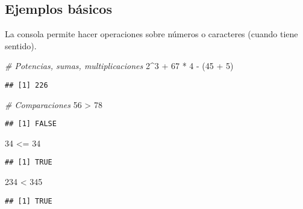 \documentclass[]{article}
\newenvironment{Shaded}{\begin{snugshade}}{\end{snugshade}}
\newcommand{\DecValTok}[1]{\textcolor[rgb]{0.00,0.00,0.81}{{#1}}}
\newcommand{\StringTok}[1]{\textcolor[rgb]{0.31,0.60,0.02}{{#1}}}
\newcommand{\CommentTok}[1]{\textcolor[rgb]{0.56,0.35,0.01}{\textit{{#1}}}}
\newcommand{\NormalTok}[1]{{#1}}
\begin{document}
\subsection{Ejemplos básicos}\label{ejemplos-basicos}

La consola permite hacer operaciones sobre números o caracteres (cuando
tiene sentido).

\begin{Shaded}
\begin{Highlighting}[]
\CommentTok{# Potencias, sumas, multiplicaciones}
\DecValTok{2}\NormalTok{^}\DecValTok{3} \NormalTok{+}\StringTok{ }\DecValTok{67} \NormalTok{*}\StringTok{ }\DecValTok{4} \NormalTok{-}\StringTok{ }\NormalTok{(}\DecValTok{45} \NormalTok{+}\StringTok{ }\DecValTok{5}\NormalTok{)}
\end{Highlighting}
\end{Shaded}

\begin{verbatim}
## [1] 226
\end{verbatim}

\begin{Shaded}
\begin{Highlighting}[]
\CommentTok{# Comparaciones}
\DecValTok{56} \NormalTok{>}\StringTok{ }\DecValTok{78} 
\end{Highlighting}
\end{Shaded}

\begin{verbatim}
## [1] FALSE
\end{verbatim}

\begin{Shaded}
\begin{Highlighting}[]
\DecValTok{34} \NormalTok{<=}\StringTok{ }\DecValTok{34}
\end{Highlighting}
\end{Shaded}

\begin{verbatim}
## [1] TRUE
\end{verbatim}

\begin{Shaded}
\begin{Highlighting}[]
\DecValTok{234} \NormalTok{<}\StringTok{ }\DecValTok{345}
\end{Highlighting}
\end{Shaded}

\begin{verbatim}
## [1] TRUE
\end{verbatim}
\end{document}
